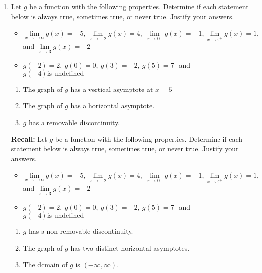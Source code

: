 \documentclass[handout,nooutcomes,noauthor]{Ximera}
\begin{document}
	\begin{enumerate}[label=\arabic*.]
		\item Let $ g $ be a function with the following properties.  Determine if each statement below is always true, sometimes true, or never true.  Justify your answers.
		\begin{itemize}
			\item $ \lim\limits_{x \to -\infty}g(x)=-5, \ \lim\limits_{x \to -2}g(x)=4, \ \lim\limits_{x \to 0^-}g(x)=-1, \lim\limits_{x \to 0^+}g(x)=1,  $ and $ \lim\limits_{x \to 3}g(x)=-2 $
			\item $ g(-2)=2, \ g(0)=0, \ g(3)=-2, \ g(5)=7,  $ and $ g(-4) \text{is undefined} $
		\end{itemize}
		\begin{enumerate}[label=(\alph*)]
			\item The graph of $ g $ has a vertical asymptote at $ x=5 $
			\item The graph of $ g $ has a horizontal asymptote.
			\item $ g $ has a removable discontinuity.
			
			\clearpage
		\end{enumerate}
			\textbf{Recall:}  Let $ g $ be a function with the following properties.  Determine if each statement below is always true, sometimes true, or never true.  Justify your answers.
			\begin{itemize}
				\item $ \lim\limits_{x \to -\infty}g(x)=-5, \ \lim\limits_{x \to -2}g(x)=4, \ \lim\limits_{x \to 0^-}g(x)=-1, \lim\limits_{x \to 0^+}g(x)=1,  $ and $ \lim\limits_{x \to 3}g(x)=-2 $
				\item $ g(-2)=2, \ g(0)=0, \ g(3)=-2, \ g(5)=7,  $ and $ g(-4) \text{is undefined} $
			\end{itemize}
			\vspace{5mm}
		\begin{enumerate}[resume,label=(\alph*)]
			\item $ g $ has a non-removable discontinuity.
			\item The graph of  $ g $ has two distinct horizontal asymptotes.
			\item The domain of $ g $ is $ (-\infty, \infty) $.
		\end{enumerate}
	\end{enumerate}	
\end{document}
